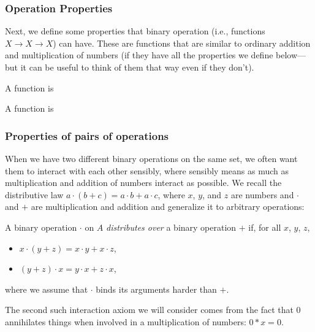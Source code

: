 
\subsubsection{Operation Properties}
Next, we define some properties that binary operation (i.e., functions $X \to X \to X$) can have. These are functions that are similar to ordinary addition and multiplication of numbers (if they have all the properties we define below---but it can be useful to think of them that way even if they don't).
\begin{Definition} %
A function is 
\end{Definition}
\begin{Example}
\end{Example}
\begin{Definition} %
A function is 
\end{Definition}
\begin{Example}
\end{Example}

\subsubsection{Properties of pairs of operations}
When we have two different binary operations on the same set, we often want them to interact with each other sensibly, where sensibly means as much as multiplication and addition of numbers interact as possible. We recall the distributive law $a\cdot(b + c) = a\cdot b + a\cdot c$, where $x$, $y$, and $z$ are numbers and $\cdot$ and $+$ are multiplication and addition and generalize it to arbitrary operations: 
\begin{Definition}
  A binary operation $\cdot$ on $A$ \emph{distributes over} a binary operation $+$ if, for all $x$, $y$, $z$,
  \begin{itemize}
  \item $x \cdot (y + z) = x \cdot y + x \cdot z$,
  \item $(y + z) \cdot x = y \cdot x + z \cdot x$,
  \end{itemize}
  where we assume that $\cdot$ binds its arguments harder than $+$.
\end{Definition}


The second such interaction axiom we will consider comes from the fact that $0$ annihilates things when involved in a multiplication of numbers: $0 * x = 0$.

